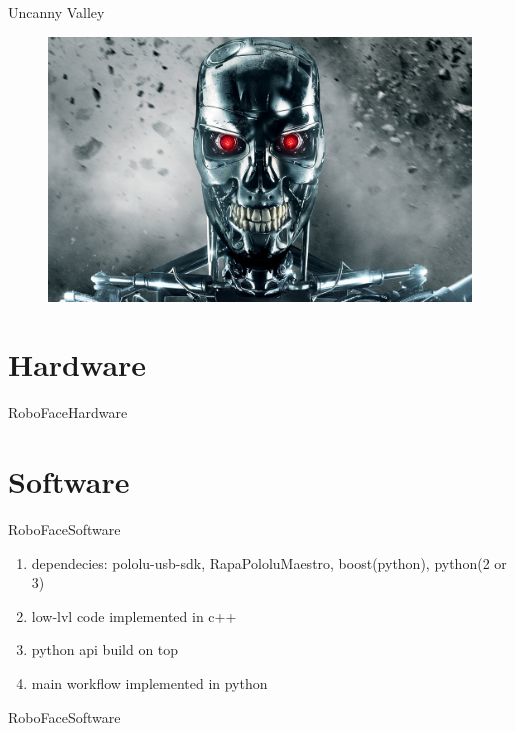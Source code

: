 \documentclass{beamer}
\begin{document}
\begin{frame}{Uncanny Valley}
	\begin{figure}
		\centering
        \includegraphics[width=\textwidth,height=\textheight,keepaspectratio]{figures/terminator_face.jpg}
		\label{fig:terminator_face}
	\end{figure}
\end{frame}

\section{Hardware}
\begin{frame}{RoboFace}{Hardware}
\end{frame}

\section{Software}
\begin{frame}{RoboFace}{Software}
    \begin{enumerate}
        \item dependecies: pololu-usb-sdk, RapaPololuMaestro, boost(python), python(2 or 3)
        \item low-lvl code implemented in c++
        \item python api build on top
        \item main workflow implemented in python
    \end{enumerate}
\end{frame}

\begin{frame}{RoboFace}{Software}
    \lstServoConfig
\end{frame}
\end{document}
